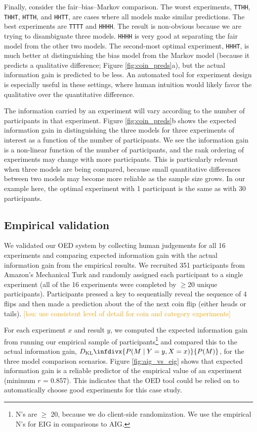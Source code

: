 \documentclass{article}
\newcommand{\dkl}{D_\mathrm{KL}\infdivx}
\newcommand{\lou}[1]{\textcolor{orange}{[lou: #1]}}
\begin{document}
Finally, consider the fair--bias--Markov comparison.
The worst experiments, \lstinline{TTHH}, \lstinline{THHT}, \lstinline{HTTH}, and \lstinline{HHTT}, are cases where all models make similar predictions.
The best experiments are \lstinline{TTTT} and \lstinline{HHHH}.
The result is non-obvious because we are trying to disambiguate three models.
\lstinline{HHHH} is very good at separating the fair model from the other two models.
The second-most optimal experiment, \lstinline{HHHT}, is much better at distinguishing the bias model from the Markov model (because it predicts a qualitative difference; Figure \ref{fig:coin_preds}a), but the actual information gain is predicted to be less.
An automated tool for experiment design is especially useful in these settings, where human intuition would likely favor the qualitative over the quantitative difference.

The information carried by an experiment will vary according to the number of participants in that experiment.
Figure \ref{fig:coin_preds}b shows the expected information gain in distinguishing the three models for three experiments of interest as a function of the number of participants.
We see the information gain is a non-linear function of the number of participants, and the rank ordering of experiments may change with more participants.
This is particularly relevant when three models are being compared, because small quantitative differences between two models may become more reliable as the sample size grows.
In our example here, the optimal experiment with 1 participant is the same as with 30 participants.


\subsection{Empirical validation}
We validated our OED system by collecting human judgements for all 16 experiments and comparing expected information gain with the actual information gain from the empirical results.
We recruited 351 participants from Amazon's Mechanical Turk and randomly assigned each participant to a single experiment (all of the 16 experiments were completed by $\geq$20 unique participants).
Participants pressed a key to sequentially reveal the sequence of 4 flips and then made a prediction about the of the next coin flip (either heads or tails).
\lou{use consistent level of detail for coin and category experiments}

For each experiment $x$ and result $y$, we computed the expected information gain from running our empirical sample of participants\footnote{N's are $\geq$ 20, because we do client-side randomization. We use the empirical N's for EIG in comparisons to AIG.} and compared this to the actual information gain, $\dkl{P(M \mid Y = y, X = x)}{P(M)}$, for the three model comparison scenarios.
Figure \ref{fig:aig_vs_eig} shows that expected information gain is a reliable predictor of the empirical value of an experiment (minimum $r$ = 0.857). This indicates that the OED tool could be relied on to automatically choose good experiments for this case study.
\end{document}
